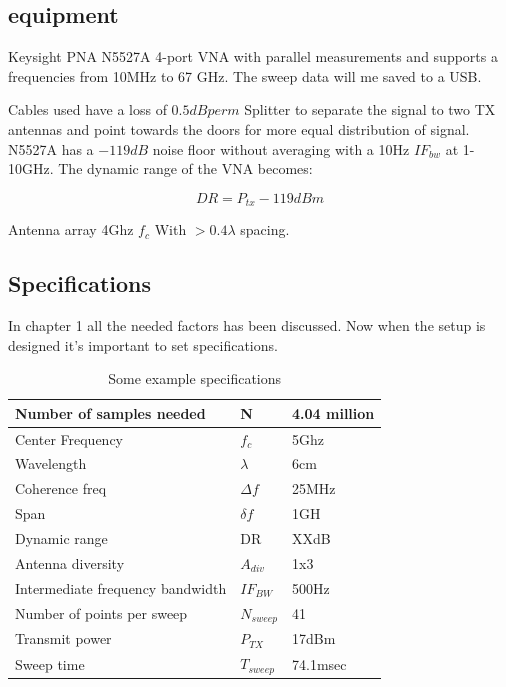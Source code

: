 \subsection{equipment}
\label{equip}
Keysight PNA N5527A 4-port VNA with parallel measurements and supports a frequencies from 10MHz to 67 GHz. The sweep data will me saved to a USB.

Cables used have a loss of $0.5dB per m$ 
Splitter to separate the signal to two TX antennas and point towards the doors for more equal distribution of signal.
N5527A has a $-119dB$ noise floor without averaging with a 10Hz $IF_{bw}$ at 1-10GHz. The dynamic range of the VNA becomes:

\begin{equation}
DR = P_{tx}-119dBm 
\label{NFvna}
\end{equation}

Antenna array 4Ghz $f_c$ With $>0.4 \lambda$ spacing.

\subsection{Specifications}
In chapter 1 all the needed factors has been discussed. Now when the setup is designed it's important to set specifications.
\begin{table}[H]
\centering
\caption{Some example specifications}
\label{final_specs}
\begin{tabular}{|l|l|l|}
\hline
Number of samples needed         & N           & 4.04 million         \\ \hline
Center Frequency                 & $f_c$       & 5Ghz             \\ \hline
Wavelength                       & $\lambda$   & 6cm           \\ \hline
Coherence freq                   & $\Delta f$  & 25MHz           \\ \hline
Span & $\delta f$ & 1GH \\ \hline
Dynamic range                    & DR          & XXdB            \\ \hline
Antenna diversity                & $A_{div}$   & 1x3                    \\ \hline
Intermediate frequency bandwidth & $IF_{BW}$     & 500Hz          \\ \hline
Number of points per sweep & $N_{sweep}$ & 41 \\ \hline
Transmit power & $P_{TX}$ & 17dBm \\ \hline
Sweep time & $T_{sweep}$ &74.1msec \\ \hline
\end{tabular}
\end{table}
